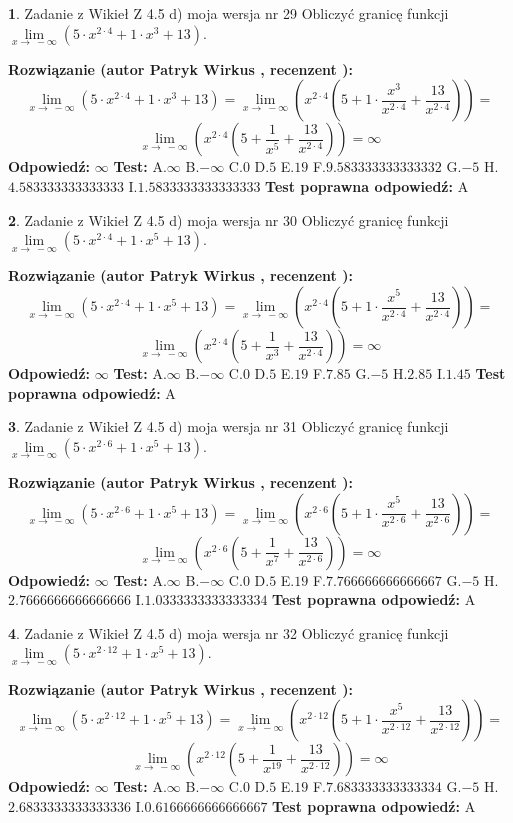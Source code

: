 \documentclass[12pt, a4paper]{article}
\theoremstyle{definition} %
\newtheorem{zad}{}
\newcommand{\zadStart}[1]{\begin{zad}#1\newline}
\newcommand{\zadStop}{\end{zad}}
\newcommand{\rozwStart}[2]{\noindent \textbf{Rozwiązanie (autor #1 , recenzent #2): }\newline}
\newcommand{\rozwStop}{\newline}
\newcommand{\odpStart}{\noindent \textbf{Odpowiedź:}\newline}
\newcommand{\odpStop}{\newline}
\newcommand{\testStart}{\noindent \textbf{Test:}\newline}
\newcommand{\testStop}{\newline}
\newcommand{\kluczStart}{\noindent \textbf{Test poprawna odpowiedź:}\newline}
\newcommand{\kluczStop}{\newline}
\begin{document}
\zadStart{Zadanie z Wikieł Z 4.5 d) moja wersja nr 29}
Obliczyć granicę funkcji  $\lim\limits_{x\to\ -\infty}(5 \cdot x^{2\cdot4}+1 \cdot x^{3}+13)$.
\zadStop
\rozwStart{Patryk Wirkus}{}
$$\lim\limits_{x\to\ -\infty}(5 \cdot x^{2\cdot4}+1 \cdot x^{3}+13) = \lim\limits_{x\to\ -\infty}(x^{2\cdot4}(5 +1 \cdot \frac{x^{3}}{x^{2\cdot4}}+\frac{13}{x^{2\cdot4}})) =$$ $$\lim\limits_{x\to\ -\infty}(x^{2\cdot4}(5 +\frac{1}{x^{5}}+\frac{13}{x^{2\cdot4}})) =\infty$$
\rozwStop
\odpStart
$\infty$
\odpStop
\testStart
A.$\infty$ B.$-\infty$ C.$0$ D.$5$ E.$19$
F.$9.583333333333332$ G.$-5$
H.$4.583333333333333$
I.$1.5833333333333333$
\testStop
\kluczStart
A
\kluczStop



\zadStart{Zadanie z Wikieł Z 4.5 d) moja wersja nr 30}
Obliczyć granicę funkcji  $\lim\limits_{x\to\ -\infty}(5 \cdot x^{2\cdot4}+1 \cdot x^{5}+13)$.
\zadStop
\rozwStart{Patryk Wirkus}{}
$$\lim\limits_{x\to\ -\infty}(5 \cdot x^{2\cdot4}+1 \cdot x^{5}+13) = \lim\limits_{x\to\ -\infty}(x^{2\cdot4}(5 +1 \cdot \frac{x^{5}}{x^{2\cdot4}}+\frac{13}{x^{2\cdot4}})) =$$ $$\lim\limits_{x\to\ -\infty}(x^{2\cdot4}(5 +\frac{1}{x^{3}}+\frac{13}{x^{2\cdot4}})) =\infty$$
\rozwStop
\odpStart
$\infty$
\odpStop
\testStart
A.$\infty$ B.$-\infty$ C.$0$ D.$5$ E.$19$
F.$7.85$ G.$-5$
H.$2.85$
I.$1.45$
\testStop
\kluczStart
A
\kluczStop



\zadStart{Zadanie z Wikieł Z 4.5 d) moja wersja nr 31}
Obliczyć granicę funkcji  $\lim\limits_{x\to\ -\infty}(5 \cdot x^{2\cdot6}+1 \cdot x^{5}+13)$.
\zadStop
\rozwStart{Patryk Wirkus}{}
$$\lim\limits_{x\to\ -\infty}(5 \cdot x^{2\cdot6}+1 \cdot x^{5}+13) = \lim\limits_{x\to\ -\infty}(x^{2\cdot6}(5 +1 \cdot \frac{x^{5}}{x^{2\cdot6}}+\frac{13}{x^{2\cdot6}})) =$$ $$\lim\limits_{x\to\ -\infty}(x^{2\cdot6}(5 +\frac{1}{x^{7}}+\frac{13}{x^{2\cdot6}})) =\infty$$
\rozwStop
\odpStart
$\infty$
\odpStop
\testStart
A.$\infty$ B.$-\infty$ C.$0$ D.$5$ E.$19$
F.$7.766666666666667$ G.$-5$
H.$2.7666666666666666$
I.$1.0333333333333334$
\testStop
\kluczStart
A
\kluczStop



\zadStart{Zadanie z Wikieł Z 4.5 d) moja wersja nr 32}
Obliczyć granicę funkcji  $\lim\limits_{x\to\ -\infty}(5 \cdot x^{2\cdot12}+1 \cdot x^{5}+13)$.
\zadStop
\rozwStart{Patryk Wirkus}{}
$$\lim\limits_{x\to\ -\infty}(5 \cdot x^{2\cdot12}+1 \cdot x^{5}+13) = \lim\limits_{x\to\ -\infty}(x^{2\cdot12}(5 +1 \cdot \frac{x^{5}}{x^{2\cdot12}}+\frac{13}{x^{2\cdot12}})) =$$ $$\lim\limits_{x\to\ -\infty}(x^{2\cdot12}(5 +\frac{1}{x^{19}}+\frac{13}{x^{2\cdot12}})) =\infty$$
\rozwStop
\odpStart
$\infty$
\odpStop
\testStart
A.$\infty$ B.$-\infty$ C.$0$ D.$5$ E.$19$
F.$7.683333333333334$ G.$-5$
H.$2.6833333333333336$
I.$0.6166666666666667$
\testStop
\kluczStart
A
\kluczStop
\end{document}
